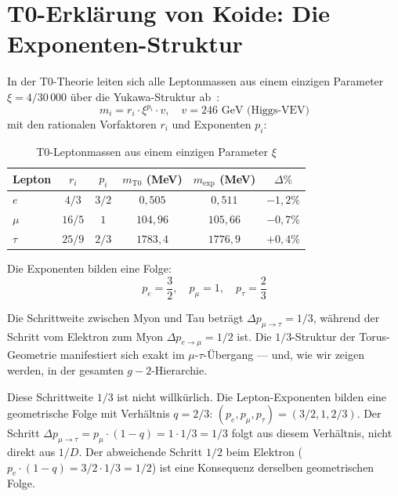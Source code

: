 \section{T0-Erklärung von Koide: Die Exponenten-Struktur}

In der T0-Theorie leiten sich alle Leptonmassen aus einem einzigen Parameter $\xi = 4/30\,000$ über die Yukawa-Struktur ab~\cite{Pascher006}:
\begin{equation}
	m_i = r_i \cdot \xi^{p_i} \cdot v, \quad v = 246 \text{ GeV (Higgs-VEV)}
	\label{eq:yukawa}
\end{equation}
mit den rationalen Vorfaktoren $r_i$ und Exponenten $p_i$:

\begin{table}[h]
	\centering
	\begin{tabular}{lccccc}
		\toprule
		\textbf{Lepton} & $r_i$ & $p_i$ & $m_{\text{T0}}$ (MeV) & $m_{\text{exp}}$ (MeV) & $\Delta\%$ \\
		\midrule
		$e$   & $4/3$  & $3/2$ & $0{,}505$  & $0{,}511$  & $-1{,}2\%$ \\
		$\mu$ & $16/5$ & $1$   & $104{,}96$ & $105{,}66$ & $-0{,}7\%$ \\
		$\tau$& $25/9$ & $2/3$ & $1783{,}4$ & $1776{,}9$ & $+0{,}4\%$ \\
		\bottomrule
	\end{tabular}
	\caption{T0-Leptonmassen aus einem einzigen Parameter $\xi$}
	\label{tab:masses}
\end{table}

Die Exponenten bilden eine Folge:
\begin{equation}
	p_e = \frac{3}{2}, \quad p_\mu = 1, \quad p_\tau = \frac{2}{3}
	\label{eq:exponents}
\end{equation}

Die Schrittweite zwischen Myon und Tau beträgt $\Delta p_{\mu\to\tau} = 1/3$, während der Schritt vom Elektron zum Myon $\Delta p_{e\to\mu} = 1/2$ ist. Die $1/3$-Struktur der Torus-Geometrie manifestiert sich exakt im $\mu$-$\tau$-Übergang — und, wie wir zeigen werden, in der gesamten $g-2$-Hierarchie.

Diese Schrittweite $1/3$ ist nicht willkürlich. Die Lepton-Exponenten
bilden eine geometrische Folge mit Verhältnis $q = 2/3$:
$(p_e, p_\mu, p_\tau) = (3/2, 1, 2/3)$. Der Schritt
$\Delta p_{\mu\to\tau} = p_\mu \cdot (1-q) = 1 \cdot 1/3 = 1/3$ folgt
aus diesem Verhältnis, nicht direkt aus $1/D$.
Der abweichende Schritt $1/2$ beim Elektron
($p_e \cdot (1-q) = 3/2 \cdot 1/3 = 1/2$) ist eine Konsequenz
derselben geometrischen Folge.

